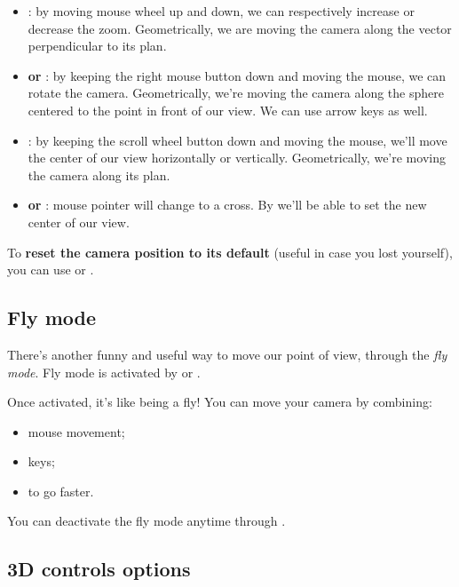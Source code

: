 \begin{itemize}
    \item \textbf{}: by moving mouse wheel up and down, we can respectively increase or decrease the zoom. Geometrically, we are moving the camera along the vector perpendicular to its plan.
    \item \textbf{ or \keys{\arrowkeyup \arrowkeydown \arrowkeyleft \arrowkeyright }}: by keeping the right mouse button down and moving the mouse, we can rotate the camera. Geometrically, we're moving the camera along the sphere centered to the point in front of our view. We can use arrow keys as well.
    \item \textbf{}: by keeping the scroll wheel button down and moving the mouse, we'll move the center of our view horizontally or vertically. Geometrically, we're moving the camera along its plan.
    \item \textbf{ or }: mouse pointer will change to a cross. By  we'll be able to set the new center of our view.
\end{itemize}

To \textbf{reset the camera position to its default} (useful in case you lost yourself), you can use  or .

\subsection{Fly mode}

There's another funny and useful way to move our point of view, through the \emph{fly mode}. Fly mode is activated by  or .
\par Once activated, it's like being a fly! You can move your camera by combining:
\begin{itemize}
    \item mouse movement;
    \item {} keys;
    \item {} to go faster.
\end{itemize}

You can deactivate the fly mode anytime through .

\subsection{3D controls options}

